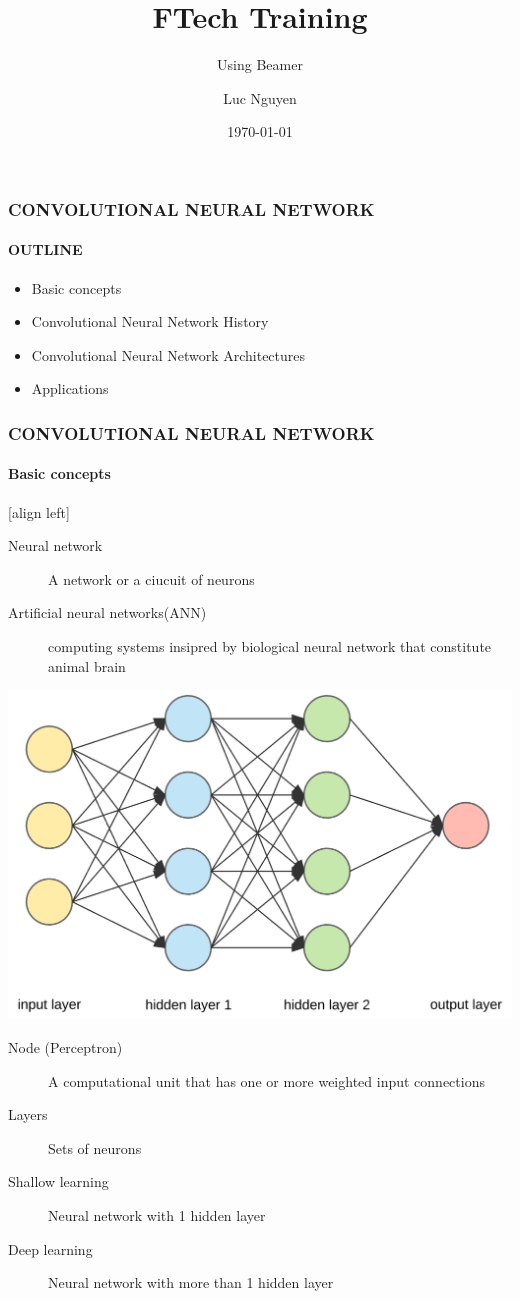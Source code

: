 \documentclass[11pt]{beamer}
\title{FTech Training}
\subtitle{Using Beamer}
\author{Luc Nguyen}
\institute{HUST}
\date{\today}
\begin{document}
	\begin{frame}
		\frametitle{\textbf{CONVOLUTIONAL NEURAL NETWORK}}
		\framesubtitle{OUTLINE}
		\begin{itemize}
			\item Basic concepts
			\item Convolutional Neural Network History
			\item Convolutional Neural Network Architectures 
			\item Applications
		\end{itemize}
	\end{frame}
	\begin{frame}
		\frametitle{\textbf{CONVOLUTIONAL NEURAL NETWORK}}
		\framesubtitle{Basic concepts}
		[align left]
		\begin{minipage}{0.57\textwidth}
			\begin{description}
				\item[Neural network]A network or a ciucuit of neurons
				\item[Artificial neural networks(ANN)]computing systems insipred by biological neural network that constitute animal brain
			\end{description}
		\end{minipage}
		\begin{minipage}{0.4\textwidth}
			\includegraphics[scale=0.12]{CNN_Visualize.png}
		\end{minipage}
		
		\begin{description} 
			\item[Node (Perceptron)] A computational unit that has one or more weighted input connections
			\item[Layers] Sets of neurons
			\item[Shallow learning] Neural network with 1 hidden layer
			\item[Deep learning] Neural network with more than 1 hidden layer
		\end{description}
	\end{frame}
\end{document}
